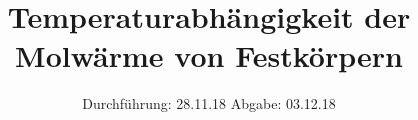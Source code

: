 

\subject{V47}
\title{Temperaturabhängigkeit der Molwärme von Festkörpern}
\date{%
  Durchführung: 28.11.18
  \hspace{3em}
  Abgabe: 03.12.18
}



\maketitle
\thispagestyle{empty}
\tableofcontents
\newpage






\printbibliography{}


